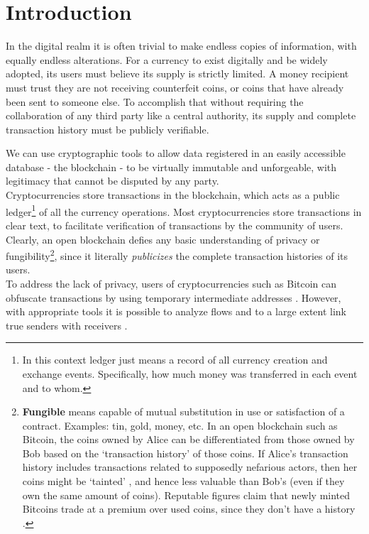 \chapter{Introduction}
\label{chapter:introduction}

In the digital realm it is often trivial to make endless copies of information, with equally endless alterations. For a currency to exist digitally and be widely adopted, its users must believe its supply is strictly limited. A money recipient must trust they are not receiving counterfeit coins, or coins that have already been sent to someone else. To accomplish that without requiring the collaboration of any third party like a central authority, its supply and complete transaction history must be publicly verifiable.

We can use cryptographic tools to allow data registered in an easily accessible database - the blockchain - to be virtually immutable and unforgeable, with legitimacy that cannot be disputed by any party.
\\ \newline
Cryptocurrencies store transactions in the blockchain, which acts as a public ledger\footnote{In this context ledger just means a record of all currency creation and exchange events. Specifically, how much money was transferred in each event and to whom.} of all the currency operations. Most cryptocurrencies store transactions in clear text, to facilitate verification of transactions by the community of users.
\\ \newline
Clearly, an open blockchain defies any basic understanding of privacy or fungibility\footnote{\textbf{Fungible} means capable of mutual substitution in use or satisfaction of a contract. Examples: tin, gold, money, etc.\cite{mises-org-fungible} In an open blockchain such as Bitcoin, the coins owned by Alice can be differentiated from those owned by Bob based on the `transaction history' of those coins. If Alice's transaction history includes transactions related to supposedly nefarious actors, then her coins might be `tainted' \cite{bitcoin-big-bang-taint}, and hence less valuable than Bob's (even if they own the same amount of coins). Reputable figures claim that newly minted Bitcoins trade at a premium over used coins, since they don't have a history \cite{new-bitcoin-premium}.}, since it literally {\em publicizes} the complete transaction histories of its users.
\\ \newline
To address the lack of privacy, users of cryptocurrencies such as Bitcoin can obfuscate transactions by using temporary intermediate addresses \cite{DBLP:journals/corr/NarayananM17}. However, with appropriate tools it is possible to analyze flows and to a large extent link true senders with receivers \cite{DBLP:journals/corr/ShenTuY15b, DK-police-tracing-btc, Andrew-Cox-Sandia, chainalysis-2020-report}.

